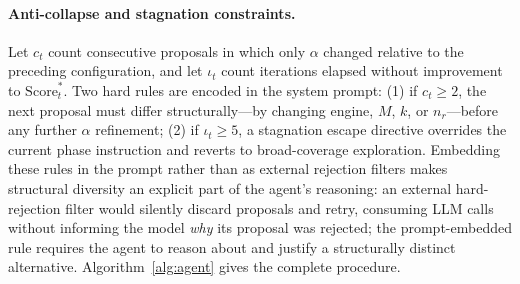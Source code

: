 \documentclass[sigconf, nonacm]{acmart}
\theoremstyle{definition}
\begin{document}
\paragraph{Anti-collapse and stagnation constraints.}
Let $c_t$ count consecutive proposals in which only $\alpha$ changed
relative to the preceding configuration, and let $\iota_t$ count iterations elapsed
without improvement to $\mathrm{Score}^*_t$.
Two hard rules are encoded in the system prompt:
(1) if $c_t \geq 2$, the next proposal must differ structurally---by changing engine,
$M$, $k$, or $n_r$---before any further $\alpha$ refinement;
(2) if $\iota_t \geq 5$, a stagnation escape directive
overrides the current phase instruction and reverts to broad-coverage exploration.
Embedding these rules in the prompt rather than as external rejection filters makes
structural diversity an explicit part of the agent's reasoning: an external
hard-rejection filter would silently discard proposals and retry, consuming LLM
calls without informing the model \emph{why} its proposal was rejected; the
prompt-embedded rule requires the agent to reason about and justify a structurally
distinct alternative.
Algorithm~\ref{alg:agent} gives the complete procedure.
\end{document}
